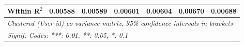 \begin{table}[htbp]
\begin{threeparttable}[b]
\begin{tabular}{lcccccc}
         Within R$^2$               & 0.00588          & 0.00589          & 0.00601          & 0.00604          & 0.00670          & 0.00688\\  
         \midrule \midrule
         \multicolumn{7}{l}{\emph{Clustered (User id) co-variance matrix, 95\% confidence intervals in brackets}}\\
         \multicolumn{7}{l}{\emph{Signif. Codes: ***: 0.01, **: 0.05, *: 0.1}}\\
      \end{tabular}
   \end{threeparttable}
\end{table}


